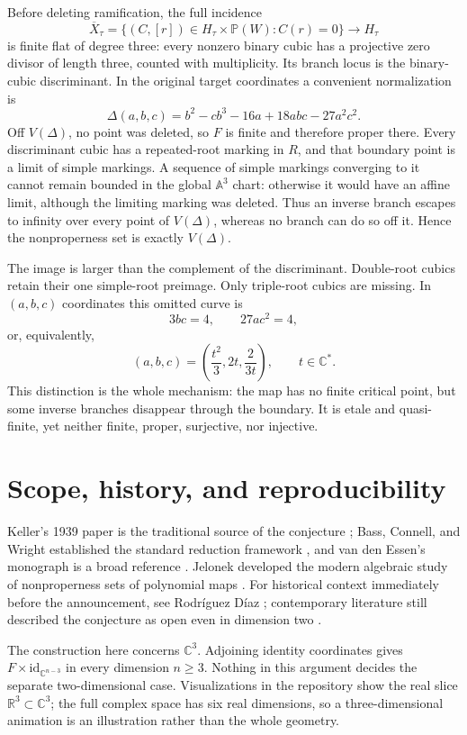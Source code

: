 \documentclass[11pt,a4paper]{article}
\theoremstyle{remark}
\newcommand{\A}{\mathbb A}
\newcommand{\C}{\mathbb C}
\newcommand{\PP}{\mathbb P}
\begin{document}
Before deleting ramification, the full incidence
\[
\overline X_\tau=\{(C,[r])\in H_\tau\times\PP(W):C(r)=0\}
\longrightarrow H_\tau
\]
is finite flat of degree three: every nonzero binary cubic has a projective
zero divisor of length three, counted with multiplicity.  Its branch locus is
the binary-cubic discriminant.  In the original target coordinates a
convenient normalization is
\[
\Delta(a,b,c)=b^2-cb^3-16a+18abc-27a^2c^2.
\tag{5.2}
\]
Off $V(\Delta)$, no point was deleted, so $F$ is finite and therefore proper
there.  Every discriminant cubic has a repeated-root marking in $R$, and that
boundary point is a limit of simple markings.  A sequence of simple markings
converging to it cannot remain bounded in the global $\A^3$ chart: otherwise
it would have an affine limit, although the limiting marking was deleted.
Thus an inverse branch escapes to infinity over every point of $V(\Delta)$,
whereas no branch can do so off it.  Hence the nonproperness set is exactly
$V(\Delta)$.

The image is larger than the complement of the discriminant.  Double-root
cubics retain their one simple-root preimage.  Only triple-root cubics are
missing.  In $(a,b,c)$ coordinates this omitted curve is
\[
  3bc=4,\qquad27ac^2=4,
\]
or, equivalently,
\[
  (a,b,c)=\left(\frac{t^2}{3},2t,\frac{2}{3t}\right),
  \qquad t\in\C^*.
\tag{5.3}
\]
This distinction is the whole mechanism: the map has no finite critical
point, but some inverse branches disappear through the boundary.  It is
etale and quasi-finite, yet neither finite, proper, surjective, nor injective.

\section{Scope, history, and reproducibility}

Keller's 1939 paper is the traditional source of the conjecture
\cite{Keller}; Bass, Connell, and Wright established the standard reduction
framework \cite{BCW}, and van den Essen's monograph is a broad reference
\cite{Essen}.  Jelonek developed the modern algebraic study of nonproperness
sets of polynomial maps \cite{Jelonek}.  For historical context immediately
before the announcement, see Rodr\'iguez D\'iaz \cite{Rodriguez}; contemporary
literature still described the conjecture as open even in dimension two
\cite{Bisi}.

The construction here concerns $\C^3$.  Adjoining identity coordinates gives
$F\times\mathrm{id}_{\C^{n-3}}$ in every dimension $n\ge3$.  Nothing in this
argument decides the separate two-dimensional case.  Visualizations in the
repository show the real slice $\mathbb R^3\subset\C^3$; the full complex
space has six real dimensions, so a three-dimensional animation is an
illustration rather than the whole geometry.
\end{document}
